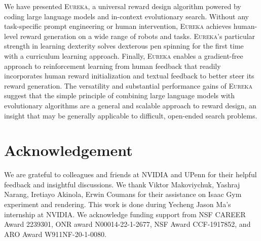 \documentclass{article} %
\theoremstyle{definition}
\newcommand{\ourmethod}{\mbox{\textsc{Eureka}}\xspace}
\begin{document}
We have presented \ourmethod, a universal reward design algorithm powered by coding large language models and in-context evolutionary search. Without any task-specific prompt engineering or human intervention, \ourmethod achieves human-level reward generation on a wide range of robots and tasks. \ourmethod's particular strength in learning dexterity solves dexterous pen spinning for the first time with a curriculum learning approach. Finally, \ourmethod enables a gradient-free approach to reinforcement learning from human feedback that readily incorporates human reward initialization and textual feedback to better steer its reward generation. The versatility and substantial performance gains of \ourmethod suggest that the simple principle of combining large language models with evolutionary algorithms are a general and scalable approach to reward design, an insight that may be generally applicable to difficult, open-ended search problems. 





\newpage 

\section*{Acknowledgement}
We are grateful to colleagues and friends at NVIDIA and UPenn for their helpful feedback and insightful discussions. We thank Viktor Makoviychuk, Yashraj Narang, Iretiayo Akinola, Erwin Coumans for their assistance on Isaac Gym experiment and rendering. This work is done during Yecheng Jason Ma's internship at NVIDIA. We acknowledge funding support from NSF CAREER Award 2239301, ONR award N00014-22-1-2677, NSF Award CCF-1917852, and ARO Award W911NF-20-1-0080.


\newpage 




\newpage 

\appendix

\end{document}
